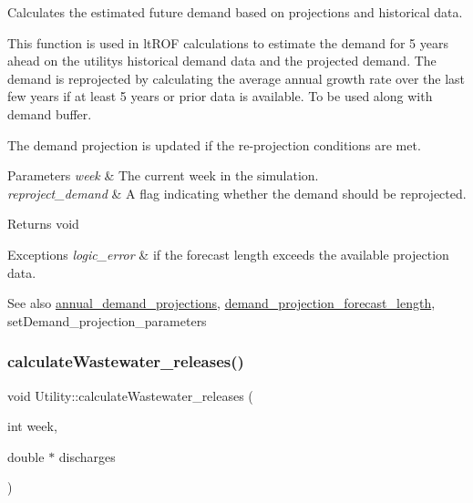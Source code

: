 Calculates the estimated future demand based on projections and historical data. 

This function is used in lt\+R\+OF calculations to estimate the demand for 5 years ahead on the utility\textquotesingle{}s historical demand data and the projected demand. The demand is reprojected by calculating the average annual growth rate over the last few years if at least 5 years or prior data is available. To be used along with demand buffer.

The demand projection is updated if the re-\/projection conditions are met.


\begin{DoxyParams}{Parameters}
{\em week} & The current week in the simulation. \\
\hline
{\em reproject\+\_\+demand} & A flag indicating whether the demand should be reprojected.\\
\hline
\end{DoxyParams}
\begin{DoxyReturn}{Returns}
void
\end{DoxyReturn}

\begin{DoxyExceptions}{Exceptions}
{\em logic\+\_\+error} & if the forecast length exceeds the available projection data.\\
\hline
\end{DoxyExceptions}
\begin{DoxySeeAlso}{See also}
\mbox{\hyperlink{classUtility_af260b06faba5238fe33687eff5ff1570}{annual\+\_\+demand\+\_\+projections}}, \mbox{\hyperlink{classUtility_a50fd81c790bf79ac989effa1bd3edaec}{demand\+\_\+projection\+\_\+forecast\+\_\+length}}, set\+Demand\+\_\+projection\+\_\+parameters 
\end{DoxySeeAlso}
\mbox{\label{classUtility_a5feecc73d561de022eb6ba3c657b3dbc}} 
\subsubsection{\texorpdfstring{calculate\+Wastewater\+\_\+releases()}{calculateWastewater\_releases()}}
{\footnotesize\ttfamily void Utility\+::calculate\+Wastewater\+\_\+releases (\begin{DoxyParamCaption}\item[{int}]{week,  }\item[{double $\ast$}]{discharges }\end{DoxyParamCaption})}



